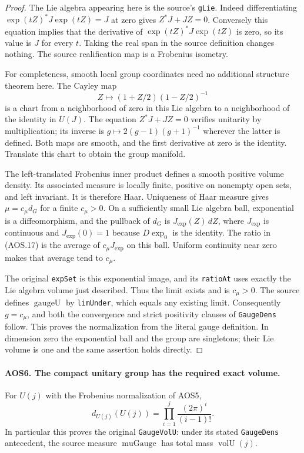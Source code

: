 \documentclass[11pt,a4paper]{article}
\numberwithin{equation}{section}
\theoremstyle{remark}\newtheorem{remark}[theorem]{Remark}
\begin{document}
\begin{proof}
The Lie algebra appearing here is the source's \texttt{g\allowbreak Lie}.
Indeed differentiating $\exp(tZ)^*J\exp(tZ)=J$ at zero gives
$Z^*J+JZ=0$.  Conversely this equation implies that the derivative
of $\exp(tZ)^*J\exp(tZ)$ is zero, so its value is $J$ for every
$t$.  Taking the real span in the source definition changes nothing.
The source realification map is a Frobenius isometry.

For completeness, smooth local group coordinates need no additional
structure theorem here.  The Cayley map
\[
       Z\longmapsto (1+Z/2)(1-Z/2)^{-1}
\]
is a chart from a neighborhood of zero in this Lie algebra to a
neighborhood of the identity in $U(J)$.  The equation
$Z^*J+JZ=0$ verifies unitarity by multiplication; its inverse is
$g\mapsto2(g-1)(g+1)^{-1}$ wherever the latter is defined.
Both maps are smooth, and the first derivative at zero is the
identity.  Translate this chart to obtain the group manifold.

The left-translated Frobenius inner product defines a smooth positive
volume density.  Its associated measure is locally finite, positive
on nonempty open sets, and left invariant.  It is therefore Haar.
Uniqueness of Haar measure gives $\mu=c_\mu d_G$ for a finite
$c_\mu>0$.  On a sufficiently small Lie algebra ball, exponential
is a diffeomorphism, and the pullback of $d_G$ is
$J_{\exp}(Z)\,dZ$, where $J_{\exp}$ is continuous and
$J_{\exp}(0)=1$ because $D\exp_0$ is the identity.  The ratio in
(AOS.17) is the average of $c_\mu J_{\exp}$ on this ball.  Uniform
continuity near zero makes that average tend to $c_\mu$.

The original \texttt{exp\allowbreak Set} is this exponential image, and its
\texttt{ratio\allowbreak At} uses exactly the Lie algebra volume just described.
Thus the limit exists and is $c_\mu>0$.  The source defines
$\operatorname{gaugeU}$ by \texttt{lim\allowbreak Under}, which equals any
existing limit.  Consequently $g=c_\mu$, and both the convergence
and strict positivity clauses of \texttt{Gauge\allowbreak Dens} follow.  This
proves the normalization from the literal gauge definition.  In
dimension zero the exponential ball and the group are singletons;
their Lie volume is one and the same assertion holds directly.
\end{proof}

\paragraph{AOS6. The compact unitary group has the required exact volume.}
\label{claim:AOS6}
For $U(j)$ with the Frobenius normalization of AOS5,
\[
                  d_{U(j)}(U(j))
                      =\prod_{i=1}^{j}\frac{(2\pi)^i}{(i-1)!}.
 \tag{AOS.18}
\]
In particular this proves the original \texttt{Gauge\allowbreak Vol\allowbreak U}: under its
stated \texttt{Gauge\allowbreak Dens} antecedent, the source measure
$\operatorname{muGauge}$ has total mass $\operatorname{volU}(j)$.
\end{document}
